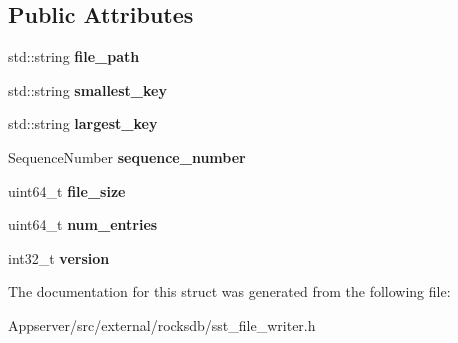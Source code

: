 \subsection*{Public Attributes}
\begin{DoxyCompactItemize}
\item 
std\+::string {\bfseries file\+\_\+path}\hypertarget{structrocksdb_1_1ExternalSstFileInfo_ab0ce3ae57eb85a27a8cad451aa4d0500}{}\label{structrocksdb_1_1ExternalSstFileInfo_ab0ce3ae57eb85a27a8cad451aa4d0500}

\item 
std\+::string {\bfseries smallest\+\_\+key}\hypertarget{structrocksdb_1_1ExternalSstFileInfo_ad3881c42fccc3d1607632759dd7b47ff}{}\label{structrocksdb_1_1ExternalSstFileInfo_ad3881c42fccc3d1607632759dd7b47ff}

\item 
std\+::string {\bfseries largest\+\_\+key}\hypertarget{structrocksdb_1_1ExternalSstFileInfo_a7be737ed8cba93c52a3df94f96b1e9aa}{}\label{structrocksdb_1_1ExternalSstFileInfo_a7be737ed8cba93c52a3df94f96b1e9aa}

\item 
Sequence\+Number {\bfseries sequence\+\_\+number}\hypertarget{structrocksdb_1_1ExternalSstFileInfo_a3e89f2383da012bbabae9df783e41931}{}\label{structrocksdb_1_1ExternalSstFileInfo_a3e89f2383da012bbabae9df783e41931}

\item 
uint64\+\_\+t {\bfseries file\+\_\+size}\hypertarget{structrocksdb_1_1ExternalSstFileInfo_a943f0e9b49a1ceb6d0b224ad22f40f70}{}\label{structrocksdb_1_1ExternalSstFileInfo_a943f0e9b49a1ceb6d0b224ad22f40f70}

\item 
uint64\+\_\+t {\bfseries num\+\_\+entries}\hypertarget{structrocksdb_1_1ExternalSstFileInfo_a0ff1cb083e40c776e4dcf3ecabbc841c}{}\label{structrocksdb_1_1ExternalSstFileInfo_a0ff1cb083e40c776e4dcf3ecabbc841c}

\item 
int32\+\_\+t {\bfseries version}\hypertarget{structrocksdb_1_1ExternalSstFileInfo_a87e05c58b50379028da9402ca838e6a8}{}\label{structrocksdb_1_1ExternalSstFileInfo_a87e05c58b50379028da9402ca838e6a8}

\end{DoxyCompactItemize}


The documentation for this struct was generated from the following file\+:\begin{DoxyCompactItemize}
\item 
Appserver/src/external/rocksdb/sst\+\_\+file\+\_\+writer.\+h\end{DoxyCompactItemize}
